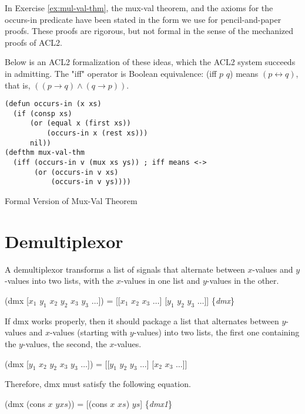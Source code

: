 \begin{aside}
In Exercise \ref{ex:mul-val-thm}, the mux-val theorem,
and the axioms for the occurs-in predicate
have been stated in the form we use for pencil-and-paper proofs.
These proofs are rigorous, but not formal
in the sense of the mechanized proofs of ACL2.

Below is an ACL2 formalization of these ideas,
which the ACL2 system succeeds in admitting.
The "iff" operator is Boolean equivalence:
(iff $p$ $q$) means $(p \leftrightarrow q)$,
that is, $((p \rightarrow q) \wedge (q \rightarrow p))$.
\\

\label{defun:occurs-in}
\begin{Verbatim}
(defun occurs-in (x xs)
  (if (consp xs)
      (or (equal x (first xs))
          (occurs-in x (rest xs)))
      nil))
(defthm mux-val-thm
  (iff (occurs-in v (mux xs ys)) ; iff means <->
       (or (occurs-in v xs)
           (occurs-in v ys))))
\end{Verbatim}
\label{defthm:mux-val}

\caption{Formal Version of Mux-Val Theorem}
\label{aside:mux-val-thm}
\end{aside}


\section{Demultiplexor}
\label{sec:dmx}

A demultiplexor transforms a list of signals that alternate between
$x$-values and $y$-values into two lists,
with the $x$-values in one list and $y$-values in the other.

\hspace{1cm} (dmx [$x_1$ $y_1$ $x_2$ $y_2$ $x_3$ $y_3$ $\dots$]) =
[[$x_1$ $x_2$ $x_3$ $\dots$] [$y_1$ $y_2$ $y_3$ $\dots$]]
\hfill \{\emph{dmx}\}

If dmx works properly, then it should package a list
that alternates between $y$-values and $x$-values
(starting with $y$-values) into two lists,
the first one containing the $y$-values,
the second, the $x$-values.

\hspace{1cm} (dmx [$y_1$ $x_2$ $y_2$ $x_3$ $y_3$ $\dots$]) =
[[$y_1$ $y_2$ $y_3$ $\dots$] [$x_2$ $x_3$ $\dots$]]

Therefore, dmx must satisfy the following equation.

\hspace{1cm} (dmx (cons $x$ $yxs$)) = [(cons $x$ $xs$) $ys$] \hfill \{\emph{dmx1}\}


